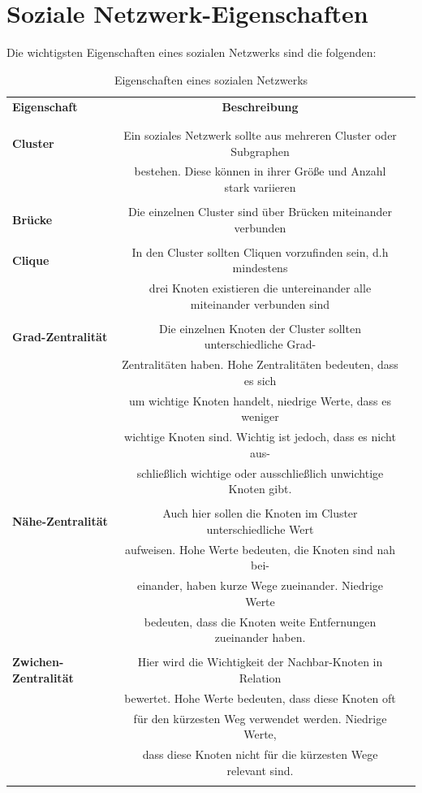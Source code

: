 \section{Soziale Netzwerk-Eigenschaften}
\label{ch:eigenschaftenTabelle}
Die wichtigsten Eigenschaften eines sozialen Netzwerks sind die folgenden: 
\begin{table}[h!]
\footnotesize
\caption{Eigenschaften eines sozialen Netzwerks}
\label{TableEigenschaften}
\begin{tabular}{lcc}\toprule 
\textbf{Eigenschaft} &\textbf{Beschreibung} \\
 &\\\midrule
 \\
  \textbf{Cluster} & Ein soziales Netzwerk sollte aus mehreren Cluster oder Subgraphen \\ &bestehen. Diese können in ihrer Größe und Anzahl stark variieren   \\
  \\
  \textbf{Brücke} & Die einzelnen Cluster sind über Brücken miteinander verbunden \\
  \\
  \textbf{Clique} & In den Cluster sollten Cliquen vorzufinden sein, d.h mindestens \\
  & drei Knoten existieren die untereinander alle miteinander verbunden sind \\
  \\
  \textbf{Grad-Zentralität} &  Die einzelnen Knoten der Cluster sollten unterschiedliche Grad-\\
  & Zentralitäten haben. Hohe Zentralitäten bedeuten, dass es sich \\
  & um wichtige Knoten handelt, niedrige Werte, dass es weniger \\ 
  & wichtige Knoten sind. Wichtig ist jedoch, dass es nicht aus-\\
  & schließlich wichtige oder ausschließlich unwichtige Knoten gibt.  \\
  \\
  \textbf{Nähe-Zentralität} & Auch hier sollen die Knoten im Cluster unterschiedliche Wert \\
  & aufweisen. Hohe Werte bedeuten, die Knoten sind nah bei- \\
  & einander, haben kurze Wege zueinander. Niedrige Werte \\
  & bedeuten, dass die Knoten weite Entfernungen zueinander haben.\\
  \\
  \textbf{Zwichen-Zentralität} & Hier wird die Wichtigkeit der Nachbar-Knoten in Relation \\
  & bewertet. Hohe Werte bedeuten, dass diese Knoten oft \\
  &für den kürzesten Weg verwendet werden. Niedrige Werte, \\
  & dass diese Knoten nicht für die kürzesten Wege relevant sind.\\
  
  \\\bottomrule
 \end{tabular}
 \end{table}
